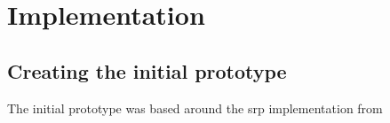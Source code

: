 \chapter{Implementation}

\section{Creating the initial prototype}
The initial prototype was based around the \gls{srp} implementation from



